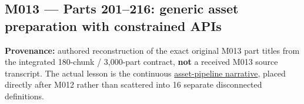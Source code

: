 \subsection{M013 --- Parts 201--216: generic asset preparation with constrained APIs}\label{appendix-fd090d982a15-m013-parts-201216-generic-asset-preparation-with-constrained-apis}

\hypertarget{appendix-fd090d982a15-m013-parts-201216-generic-asset-preparation-with-constrained-apis}{}

\textbf{Provenance:} authored reconstruction of the exact original M013 part titles from the integrated 180-chunk / 3,000-part contract, \textbf{not} a received M013 source transcript. The actual lesson is the continuous \hyperref[01-foundations-i-ch005-one-asset-pipeline-many-asset-types-generic-code-without-accidental-promises]{asset-pipeline narrative}, placed directly after M012 rather than scattered into 16 separate disconnected definitions.

